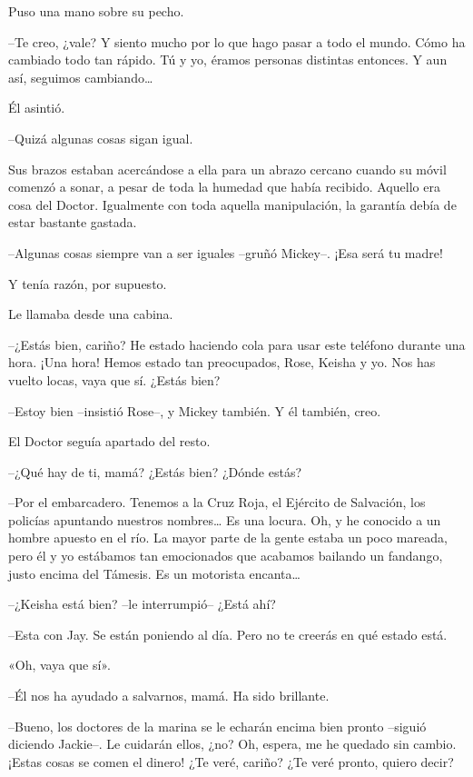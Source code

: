 {Puso una mano sobre su pecho.}

{--Te creo, ¿vale? Y siento mucho por lo que hago pasar a todo el mundo.
 Cómo ha cambiado todo tan rápido. Tú y yo, éramos personas distintas
 entonces. Y aun así, seguimos cambiando\ldots{}}

{Él asintió.}

{--Quizá algunas cosas sigan igual.}

{Sus brazos estaban acercándose a ella para un abrazo cercano cuando su
 móvil comenzó a sonar, a pesar de toda la humedad que había recibido.
 Aquello era cosa del Doctor. Igualmente con toda aquella manipulación,
la garantía debía de estar bastante gastada.}

{--Algunas cosas siempre van a ser iguales --gruñó Mickey--. ¡Esa será
tu madre!}

{Y tenía razón, por supuesto.}

{Le llamaba desde una cabina.}

{--¿Estás bien, cariño? He estado haciendo cola para usar este teléfono
 durante una hora. ¡Una hora! Hemos estado tan preocupados, Rose, Keisha
y yo. Nos has vuelto locas, vaya que sí. ¿Estás bien?}

{--Estoy bien --insistió Rose--, y Mickey también. Y él también, creo.}

{El Doctor seguía apartado del resto.}

{--¿Qué hay de ti, mamá? ¿Estás bien? ¿Dónde estás?}

{--Por el embarcadero. Tenemos a la Cruz Roja, el Ejército de Salvación,
 los policías apuntando nuestros nombres\ldots{} Es una locura. Oh, y he
 conocido a un hombre apuesto en el río. La mayor parte de la gente
 estaba un poco mareada, pero él y yo estábamos tan emocionados que
 acabamos bailando un fandango, justo encima del Támesis. Es un motorista
 encanta\ldots{}}

{--¿Keisha está bien? --le interrumpió-- ¿Está ahí?}

{--Esta con Jay. Se están poniendo al día. Pero no te creerás en qué
estado está.}

{«Oh, vaya que sí».}

{--Él nos ha ayudado a salvarnos, mamá. Ha sido brillante.}

{--Bueno, los doctores de la marina se le echarán encima bien pronto
 --siguió diciendo Jackie--. Le cuidarán ellos, ¿no? Oh, espera, me he
 quedado sin cambio. ¡Estas cosas se comen el dinero! ¿Te veré, cariño?
¿Te veré pronto, quiero decir?}

